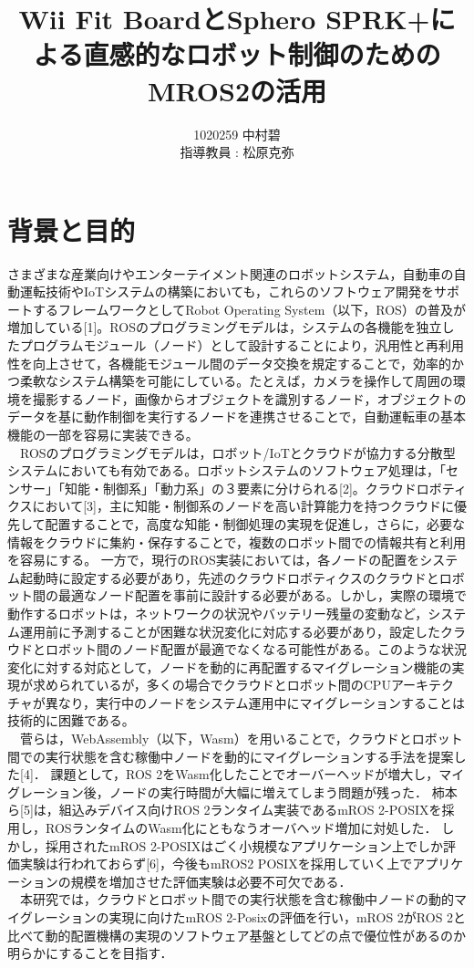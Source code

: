 \documentclass[11pt]{ujarticle}
\author{%
1020259 中村碧\\指導教員 : 松原克弥
}
\title{Wii Fit BoardとSphero SPRK+による直感的なロボット制御のためのMROS2の活用}
\begin{document}
\maketitle

\section{背景と目的}
さまざまな産業向けやエンターテイメント関連のロボットシステム，自動車の自動運転技術やIoTシステムの構築においても，これらのソフトウェア開発をサポートするフレームワークとしてRobot Operating System（以下，ROS）の普及が増加している[1]。ROSのプログラミングモデルは，システムの各機能を独立したプログラムモジュール（ノード）として設計することにより，汎用性と再利用性を向上させて，各機能モジュール間のデータ交換を規定することで，効率的かつ柔軟なシステム構築を可能にしている。たとえば，カメラを操作して周囲の環境を撮影するノード，画像からオブジェクトを識別するノード，オブジェクトのデータを基に動作制御を実行するノードを連携させることで，自動運転車の基本機能の一部を容易に実装できる。
\\　ROSのプログラミングモデルは，ロボット/IoTとクラウドが協力する分散型システムにおいても有効である。ロボットシステムのソフトウェア処理は，「センサー」「知能・制御系」「動力系」の３要素に分けられる[2]。クラウドロボティクスにおいて[3]，主に知能・制御系のノードを高い計算能力を持つクラウドに優先して配置することで，高度な知能・制御処理の実現を促進し，さらに，必要な情報をクラウドに集約・保存することで，複数のロボット間での情報共有と利用を容易にする。
一方で，現行のROS実装においては，各ノードの配置をシステム起動時に設定する必要があり，先述のクラウドロボティクスのクラウドとロボット間の最適なノード配置を事前に設計する必要がある。しかし，実際の環境で動作するロボットは，ネットワークの状況やバッテリー残量の変動など，システム運用前に予測することが困難な状況変化に対応する必要があり，設定したクラウドとロボット間のノード配置が最適でなくなる可能性がある。このような状況変化に対する対応として，ノードを動的に再配置するマイグレーション機能の実現が求められているが，多くの場合でクラウドとロボット間のCPUアーキテクチャが異なり，実行中のノードをシステム運用中にマイグレーションすることは技術的に困難である。
\\　菅らは，WebAssembly（以下，Wasm）を用いることで，クラウドとロボット間での実行状態を含む稼働中ノードを動的にマイグレーションする手法を提案した[4]．
課題として，ROS 2をWasm化したことでオーバーヘッドが増大し，マイグレーション後，ノードの実行時間が大幅に増えてしまう問題が残った．
柿本ら[5]は，組込みデバイス向けROS 2ランタイム実装であるmROS 2-POSIXを採用し，ROSランタイムのWasm化にともなうオーバヘッド増加に対処した．
しかし，採用されたmROS 2-POSIXはごく小規模なアプリケーション上でしか評価実験は行われておらず[6]，今後もmROS2 POSIXを採用していく上でアプリケーションの規模を増加させた評価実験は必要不可欠である．
\\　本研究では，クラウドとロボット間での実行状態を含む稼働中ノードの動的マイグレーションの実現に向けたmROS 2-Posixの評価を行い，mROS 2がROS 2と比べて動的配置機構の実現のソフトウェア基盤としてどの点で優位性があるのか明らかにすることを目指す．
\end{document}
